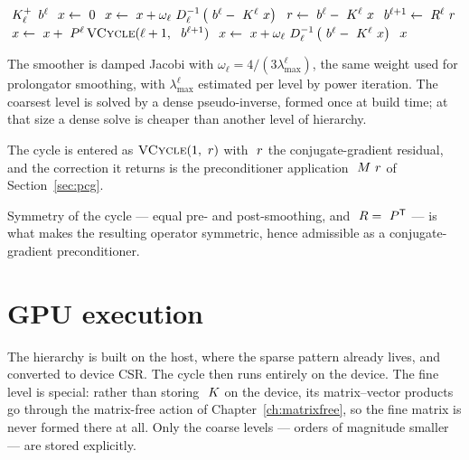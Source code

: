 \begin{algorithm}[h]
\caption{$\textsc{VCycle}(\ell, \vect{b}^{\ell})$ --- returns a correction $\vect{x}^{\ell}$}
\label{alg:vcycle}
\begin{algorithmic}[1]
      \State \Return $~K_{\ell}^{+}\,~b^{\ell}$
    \EndIf
    \State $~x \gets ~0$
      \State $~x \gets ~x + \omega_{\ell}~D_{\ell}^{-1}\left(~b^{\ell} - ~K^{\ell}~x\right)$
    \EndFor
    \State $~r \gets ~b^{\ell} - ~K^{\ell}~x$
    \State $~b^{\ell+1} \gets ~R^{\ell}~r$
    \State $\vect{x} \gets \vect{x} + \Pmat^{\ell}\,\textsc{VCycle}(\ell+1,\ \vect{b}^{\ell+1})$
      \State $~x \gets ~x + \omega_{\ell}~D_{\ell}^{-1}\left(~b^{\ell} - ~K^{\ell}~x\right)$
    \EndFor
    \State \Return $~x$
  \EndFunction
\end{algorithmic}
\end{algorithm}

The smoother is damped Jacobi with $\omega_{\ell} = 4/(3\lambda_{\max}^{\ell})$,
the same weight used for prolongator smoothing, with $\lambda_{\max}^{\ell}$
estimated per level by power iteration.  The coarsest level is solved by a
dense pseudo-inverse, formed once at build time; at that size a dense solve is
cheaper than another level of hierarchy.

The cycle is entered as $\textsc{VCycle}(1, ~r)$ with $~r$ the
conjugate-gradient residual, and the correction it returns is the preconditioner
application $~M~r$ of Section~\ref{sec:pcg}.

Symmetry of the cycle --- equal pre- and post-smoothing, and
$~R = ~P^{\mathsf{T}}$ --- is what makes the resulting operator
symmetric, hence admissible as a conjugate-gradient preconditioner.

\section{GPU execution}

The hierarchy is built on the host, where the sparse pattern already lives, and
converted to device CSR.  The cycle then runs entirely on the device.  The fine
level is special: rather than storing $~K$ on the device, its
matrix--vector products go through the matrix-free action of
Chapter~\ref{ch:matrixfree}, so the fine matrix is never formed there at all.
Only the coarse levels --- orders of magnitude smaller --- are stored
explicitly.


